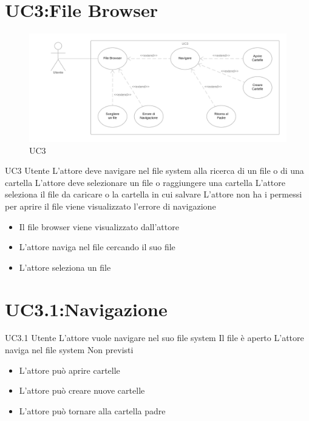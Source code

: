 \documentclass[../AnalisideiRequisiti.tex]{subfiles}
\begin{document}
	\section{UC3:File Browser}
	\begin{figure}[htp]
		\caption{UC3}
		\centering
		\includegraphics[width=\textwidth]{../img/UC03.png}
	\end{figure}
	\UserCase
	{UC3}
	{Utente}
	{}
	{L'attore deve navigare nel file system alla ricerca di un file o di una cartella}
	{L'attore deve selezionare un file o raggiungere una cartella}
	{L'attore seleziona il file da caricare o la cartella in cui salvare}
	{L'attore non ha i permessi per aprire il file viene visualizzato l'errore di navigazione }
	{
		\begin{itemize}
			\item{} Il file browser viene visualizzato dall'attore
			\item{} L'attore naviga nel file  cercando il suo file 
			\item{} L'attore seleziona un file 
		\end{itemize}
	}
	\section{UC3.1:Navigazione}
	\UserCase
	{UC3.1}
	{Utente}
	{}
	{L'attore vuole navigare nel suo file system}
	{Il file  è aperto}
	{L'attore naviga nel file system}
	{Non previsti}
	{
		\begin{itemize}
			\item{} L'attore può aprire cartelle 
			\item{} L'attore può creare nuove cartelle 
			\item{} L'attore può tornare alla cartella padre 
		\end{itemize}
	}	
\end{document}
